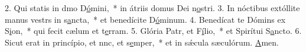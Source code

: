 2. Qui statis in dmo D\uline{ó}mini,~* in átriis domus Dei n\uline{o}stri.
3. In nóctibus extóllite manus vestrs in s\uline{a}ncta,~* et benedícite D\uline{ó}minum.
4. Benedícat te Dómins ex S\uline{i}on,~* qui fecit cælum et t\uline{e}rram.
5. Glória Patr, et F\uline{í}lio,~* et Spirítui S\uline{a}ncto.
6. Sicut erat in princípio, et nnc, et s\uline{e}mper,~* et in sǽcula sæculórum. \uline{A}men.
